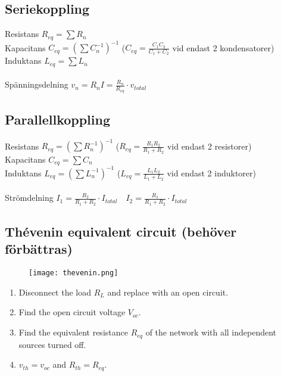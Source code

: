 \subsection{Seriekoppling}

Resistans $ R_{eq} = \sum R_n $
\\
Kapacitans  $ C_ {eq} = (\sum C_n ^{-1})^{-1} $ \tab (\( C_{eq} = \frac{C_1C_2}{C_1+C_2} \) vid endast 2 kondensatorer)
\\
Induktans $ L_{eq} = \sum L_n $
\\ \\
Spänningsdelning \tab $ v_{n} = R_nI = \frac{R_n}{R_{eq}} \cdot v_{total} $

\subsection{Parallellkoppling}

Resistans $ R_{eq} = (\sum R_n^{-1})^{-1} $ \tab ($ R_{eq} = \frac{R_1R_2}{R_1 + R_2} $ vid endast 2 resistorer)
\\
Kapacitans $ C_{eq} = \sum C_n $
\\
Induktans $ L_{eq} = (\sum L_n^{-1})^{-1} $ \tab (\(L_{eq} = \frac{L_1L_2}{L_1+L_2}\) vid endast 2 induktorer)
\\ \\
Strömdelning \tab $ I_1 = \frac{R_2}{R_1+R_2} \cdot I_{total} \quad I_2 = \frac{R_1}{R_1+R_2} \cdot I_{total} $

\subsection{Thévenin equivalent circuit (behöver förbättras)}

\begin{figure}[H]
    \centering
        \texttt{[image: thevenin.png]}
    \label{fig:thevenin}
\end{figure}

\begin{enumerate}
    \item Disconnect the load \(R_L\) and replace with an open circuit.
    \item Find the open circuit voltage \(V_{oc}\).
    \item Find the equivalent resistance \(R_{eq}\) of the network with all independent sources turned off.
    \item \(v_{th} = v_{oc}\) and \(R_{th} = R_{eq}\).
\end{enumerate}

